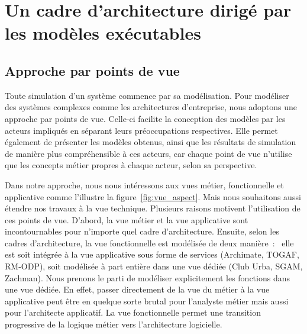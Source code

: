 \section{Un cadre d'architecture dirigé par les modèles exécutables}

\subsection{Approche par points de vue}

Toute simulation d'un système commence par sa modélisation. Pour modéliser des systèmes complexes comme les architectures d'entreprise, nous adoptons une approche par points de vue. Celle-ci facilite la conception des modèles par les acteurs impliqués en séparant leurs préoccupations respectives. Elle permet également de présenter les modèles obtenus, ainsi que les résultats de simulation de manière plus compréhensible à ces acteurs, car chaque point de vue n'utilise que les concepts métier propres à chaque acteur, selon sa perspective. 

Dans notre approche, nous nous intéressons aux vues métier, fonctionnelle et applicative comme l'illustre la figure~\ref{fig:vue_aspect}. Mais nous souhaitons aussi étendre nos travaux à la vue technique. 
Plusieurs raisons motivent l'utilisation de ces points de vue. D'abord, la vue métier et la vue applicative sont incontournables pour n'importe quel cadre d'architecture. Ensuite, selon les cadres d'architecture, la vue fonctionnelle est modélisée de deux manière~:~ elle est soit intégrée à la vue applicative sous forme de services (Archimate, TOGAF, RM-ODP), soit modélisée à part entière dans une vue dédiée (Club Urba, SGAM, Zachman). Nous prenons le parti de modéliser explicitement les fonctions dans une vue dédiée. En effet, passer directement de la vue du métier à la vue applicative peut être en quelque sorte brutal pour l'analyste métier mais aussi pour l'architecte applicatif. La vue fonctionnelle permet une transition progressive de la logique métier vers l'architecture logicielle.

